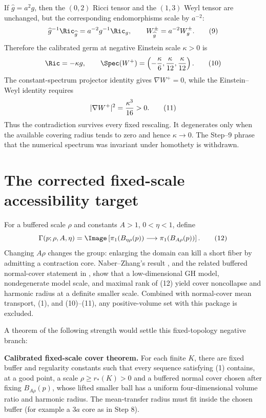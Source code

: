 If $\widehat g=a^2g$, then the $(0,2)$ Ricci tensor and the $(1,3)$ Weyl
tensor are unchanged, but the corresponding endomorphisms scale by $a^{-2}$:
\[
 \widehat g^{-1}\Ric_{\widehat g}=a^{-2}g^{-1}\Ric_g,
 \qquad W^\pm_{\widehat g}=a^{-2}W^\pm_g.                       \tag{9}
\]
Therefore the calibrated germ at negative Einstein scale $\kappa>0$ is
\[
 \Ric=-\kappa g,
 \qquad
 \Spec(W^+)=\left(-{\kappa\over6},{\kappa\over12},{\kappa\over12}\right).
                                                                    \tag{10}
\]
The constant-spectrum projector identity gives $\nabla W^+=0$, while the
Einstein--Weyl identity requires
\[
 |\nabla W^+|^2={\kappa^3\over16}>0.                            \tag{11}
\]
Thus the contradiction survives every fixed rescaling.  It degenerates only
when the available covering radius tends to zero and hence $\kappa\to0$.
The Step--9 phrase that the numerical spectrum was invariant under homothety
is withdrawn.

\section{The corrected fixed-scale accessibility target}

For a buffered scale $\rho$ and constants $A>1$, $0<\eta<1$, define
\[
 \Gamma(p;\rho,A,\eta)=\Image\left[
 \pi_1(B_{\eta\rho}(p))\longrightarrow\pi_1(B_{A\rho}(p))
 \right].                                                       \tag{12}
\]
Changing $A\rho$ changes the group: enlarging the domain can kill a short
fiber by admitting a contraction core.  Naber--Zhang's result
\cite{naber2016topology}, and the related buffered normal-cover statement in
\cite{huang2020ricci}, show that a low-dimensional GH model, nondegenerate
model scale, and maximal rank of (12) yield cover noncollapse and harmonic
radius at a definite smaller scale.  Combined with normal-cover mean
transport, (1), and (10)--(11), any positive-volume set with this package is
excluded.

A theorem of the following strength would settle this fixed-topology negative
branch:

\medskip
\noindent\textbf{Calibrated fixed-scale cover theorem.}
For each finite $K$, there are fixed buffer and regularity constants such
that every sequence satisfying (1) contains, at a good point, a scale
$\rho\ge r_*(K)>0$ and a buffered normal cover chosen after fixing
$B_{A\rho}(p)$, whose lifted smaller ball has a uniform four-dimensional
volume ratio and harmonic radius.  The mean-transfer radius must fit inside
the chosen buffer (for example a $3a$ core as in Step 8).

